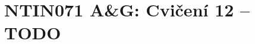 \documentclass[a4paper,12pt]{amsart}
\begin{document}
\thispagestyle{empty}

\section*{NTIN071 A\&G: Cvičení 12 -- TODO}


\medskip
\end{document}
